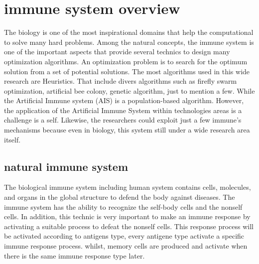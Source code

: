 \documentclass[]{interact}
\theoremstyle{plain}%
\theoremstyle{definition}
\theoremstyle{remark}
\begin{document}
\section{immune system overview}
The biology is one of the most inspirational domains that help the computational to solve many hard problems.\cite{doc7} Among the natural concepts, the immune system is one of the important aspects that provide several technics to design many optimization algorithms. An optimization problem\cite{doc6} is to search for the optimum solution from a set of potential solutions. The most algorithms used in this wide research are Heuristics.\cite{doc6} That include divers algorithms such as firefly swarm optimization, artificial bee colony, genetic algorithm, just to mention a few. While the Artificial Immune system (AIS)\cite{doc6} is a population-based algorithm. However, the application of the Artificial Immune System within technologies areas is a challenge is a self. Likewise, the researchers could exploit just a few immune's mechanisms because even in biology, this system still under a wide research area itself. 

\subsection{natural immune system}
The biological immune system including human system contains cells, molecules, and organs in the global structure to defend the body against diseases.\cite{doc6} The immune system has the ability to recognize the self-body cells and the nonself cells. In addition, this technic is very important to make an immune response by activating a suitable process to defeat the nonself cells.\cite{doc6} This response process will be activated according to antigens type, every antigene type activate a specific immune response process. whilst, memory cells are produced and activate when there is the same immune response type later.
\end{document}
